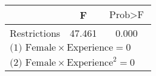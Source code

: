 {
\def\sym#1{\ifmmode^{#1}\else\(^{#1}\)\fi}
\begin{tabular}{l*{1}{cc}}
\hline\hline
          &        F&$\text{Prob}>\text{F}$\\
\hline
Restrictions&   47.461&    0.000\\
\hline\hline
\multicolumn{3}{l}{\footnotesize $\text{(1) Female}\times\text{Experience} = 0$}\\
\multicolumn{3}{l}{\footnotesize $\text{(2) Female}\times\text{Experience}^2 = 0$}\\
\end{tabular}
}
